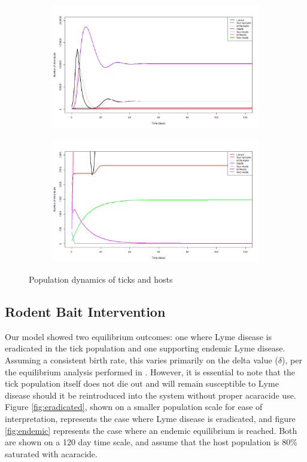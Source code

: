 \documentclass[12pt, centerh1]{article}
\begin{document}
\begin{figure}[h!]
\begin{subfigure}{\textwidth}
    \centering
    \includegraphics[scale = 0.4]{figures/base_large.png}
\end{subfigure}
\begin{subfigure}{\textwidth}
    \centering
    \includegraphics[scale = 0.4]{figures/base_small.png}
\end{subfigure}
\caption{Population dynamics of ticks and hosts}
\label{fig:base_model}
\end{figure}

\subsection{Rodent Bait Intervention}
Our model showed two equilibrium outcomes: one where Lyme disease is eradicated in the tick population and one supporting endemic Lyme disease. Assuming a consistent birth rate, this varies primarily on the delta value ($\delta$), per the equilibrium analysis performed in \cite{tosato2021host}. However, it is essential to note that the tick population itself does not die out and will remain susceptible to Lyme disease should it be reintroduced into the system without proper acaracide use. Figure \ref{fig:eradicated}, shown on a smaller population scale for ease of interpretation, represents the case where Lyme disease is eradicated, and figure \ref{fig:endemic} represents the case where an endemic equilibrium is reached. Both are shown on a 120 day time scale, and assume that the host population is 80\% saturated with acaracide.
\end{document}
